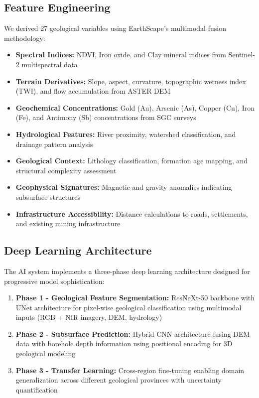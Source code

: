 \documentclass[12pt,a4paper]{article}
\begin{document}
\subsection{Feature Engineering}
We derived 27 geological variables using EarthScape's multimodal fusion methodology:

\begin{itemize}
    \item \textbf{Spectral Indices:} NDVI, Iron oxide, and Clay mineral indices from Sentinel-2 multispectral data
    \item \textbf{Terrain Derivatives:} Slope, aspect, curvature, topographic wetness index (TWI), and flow accumulation from ASTER DEM
    \item \textbf{Geochemical Concentrations:} Gold (Au), Arsenic (As), Copper (Cu), Iron (Fe), and Antimony (Sb) concentrations from SGC surveys
    \item \textbf{Hydrological Features:} River proximity, watershed classification, and drainage pattern analysis
    \item \textbf{Geological Context:} Lithology classification, formation age mapping, and structural complexity assessment
    \item \textbf{Geophysical Signatures:} Magnetic and gravity anomalies indicating subsurface structures
    \item \textbf{Infrastructure Accessibility:} Distance calculations to roads, settlements, and existing mining infrastructure
\end{itemize}

\subsection{Deep Learning Architecture}
The AI system implements a three-phase deep learning architecture designed for progressive model sophistication:

\begin{enumerate}
    \item \textbf{Phase 1 - Geological Feature Segmentation:} ResNeXt-50 backbone with UNet architecture for pixel-wise geological classification using multimodal inputs (RGB + NIR imagery, DEM, hydrology)
    \item \textbf{Phase 2 - Subsurface Prediction:} Hybrid CNN architecture fusing DEM data with borehole depth information using positional encoding for 3D geological modeling
    \item \textbf{Phase 3 - Transfer Learning:} Cross-region fine-tuning enabling domain generalization across different geological provinces with uncertainty quantification
\end{enumerate}
\end{document}
